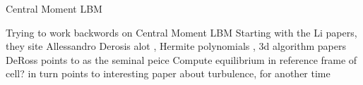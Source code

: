 \begin{frame}{Central Moment LBM}
\begin{center}
\begin{outline}
  \1 Trying to work backwords on Central Moment LBM
  \2 Starting with the Li papers, they site Allessandro Derosis alot
  , Hermite polynomials \cite{De2019}
  , 3d algorithm papers \cite{De2017}
  \2 DeRoss points to \cite{Geier2006} as the seminal peice 
  \3 Compute equilibrium in reference frame of cell?
  \3 in turn points to interesting paper about turbulence, for another time \cite{Sreenivasan1999}
\end{outline}
\end{center}
\end{frame}
